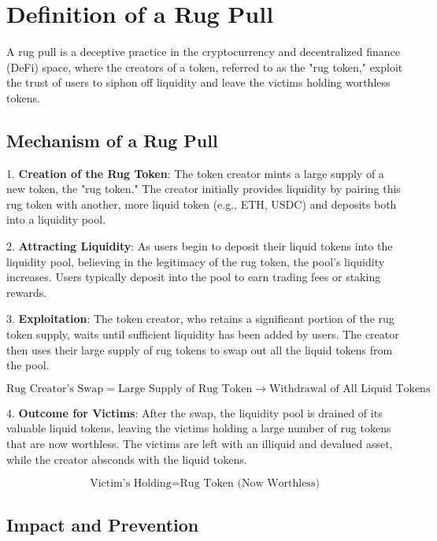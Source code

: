 \documentclass{article}
\begin{document}




\section{Definition of a Rug Pull}

A rug pull is a deceptive practice in the cryptocurrency and decentralized finance (DeFi) space, where the creators of a token, referred to as the "rug token," exploit the trust of users to siphon off liquidity and leave the victims holding worthless tokens.

\subsection{Mechanism of a Rug Pull}

1. \textbf{Creation of the Rug Token}: The token creator mints a large supply of a new token, the "rug token." The creator initially provides liquidity by pairing this rug token with another, more liquid token (e.g., ETH, USDC) and deposits both into a liquidity pool.

2. \textbf{Attracting Liquidity}: As users begin to deposit their liquid tokens into the liquidity pool, believing in the legitimacy of the rug token, the pool's liquidity increases. Users typically deposit into the pool to earn trading fees or staking rewards.

3. \textbf{Exploitation}: The token creator, who retains a significant portion of the rug token supply, waits until sufficient liquidity has been added by users. The creator then uses their large supply of rug tokens to swap out all the liquid tokens from the pool.

\[
\text{Rug Creator's Swap} = \text{Large Supply of Rug Token} \rightarrow \text{Withdrawal of All Liquid Tokens}
\]

4. \textbf{Outcome for Victims}: After the swap, the liquidity pool is drained of its valuable liquid tokens, leaving the victims holding a large number of rug tokens that are now worthless. The victims are left with an illiquid and devalued asset, while the creator absconds with the liquid tokens.

\[
\text{Victim's Holding} = \text{Rug Token (Now Worthless)}
\]

\subsection{Impact and Prevention}
\end{document}
